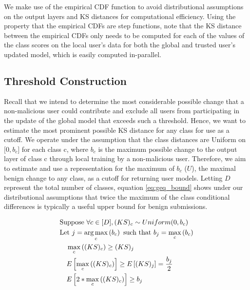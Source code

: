 \documentclass{article} %
\begin{document}
We make use of the empirical CDF function to avoid distributional assumptions on the output layers and KS distances for computational efficiency. Using the property that the empirical CDFs are step functions, note that the KS distance between the empirical CDFs only needs to be computed for each of the values of the class scores on the local user's data for both the global and trusted user's updated model, which is easily computed in-parallel.

%
\subsection{Threshold Construction}

Recall that we intend to determine the most considerable possible change that a non-malicious user could contribute and exclude all users from participating in the update of the global model that exceeds such a threshold. Hence, we want to estimate the most prominent possible KS distance for any class for use as a cutoff. We operate under the assumption that the class distances are Uniform on $\mathopen[0, b_c\mathclose]$ for each class c, where $b_c$ is the maximum possible change to the output layer of class c through local training by a non-malicious user. Therefore, we aim to estimate and use a representation for the maximum of $b_c$ ($U$), the maximal benign change to any class, as a cutoff for returning user models. Letting $D$ represent the total number of classes, equation \ref{eq:geq_bound} shows under our distributional assumptions that twice the maximum of the class conditional differences is typically a useful upper bound for benign submissions.

\begin{align}
    & \textrm{Suppose } \forall c \in \mathopen[ D \mathclose], (KS)_c \sim Uniform(0, b_c) \nonumber \\
    & \textrm{Let } j = \operatorname*{arg\,max}_c \left( b_c \right) \textrm{ such that } b_j = \max_c \left( b_c \right) \nonumber \\
    & \quad \max_c \left( (KS)_c \right) \geq (KS)_j \nonumber \\
    & \quad E \left[ \max_c \left( (KS)_c \right) \right] \geq E \left[ (KS)_j \right] = \dfrac{b_j}{2} \nonumber \\
    & \quad E \left[ 2 * \max_c \left( (KS)_c \right) \right] \geq b_j \label{eq:geq_bound} 
\end{align}
\end{document}
